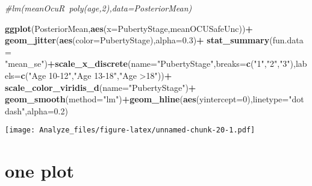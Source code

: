 \documentclass[]{article}
\newenvironment{Shaded}{\begin{snugshade}}{\end{snugshade}}
\newcommand{\KeywordTok}[1]{\textcolor[rgb]{0.13,0.29,0.53}{\textbf{#1}}}
\newcommand{\DataTypeTok}[1]{\textcolor[rgb]{0.13,0.29,0.53}{#1}}
\newcommand{\DecValTok}[1]{\textcolor[rgb]{0.00,0.00,0.81}{#1}}
\newcommand{\FloatTok}[1]{\textcolor[rgb]{0.00,0.00,0.81}{#1}}
\newcommand{\StringTok}[1]{\textcolor[rgb]{0.31,0.60,0.02}{#1}}
\newcommand{\CommentTok}[1]{\textcolor[rgb]{0.56,0.35,0.01}{\textit{#1}}}
\newcommand{\OperatorTok}[1]{\textcolor[rgb]{0.81,0.36,0.00}{\textbf{#1}}}
\newcommand{\NormalTok}[1]{#1}
\begin{document}
\begin{Shaded}
\begin{Highlighting}[]
\CommentTok{#lm(meanOcuR~poly(age,2),data=PosteriorMean)}

\KeywordTok{ggplot}\NormalTok{(PosteriorMean,}\KeywordTok{aes}\NormalTok{(}\DataTypeTok{x=}\NormalTok{PubertyStage,meanOCUSafeUnc))}\OperatorTok{+}
\StringTok{  }\KeywordTok{geom_jitter}\NormalTok{(}\KeywordTok{aes}\NormalTok{(}\DataTypeTok{color=}\NormalTok{PubertyStage),}\DataTypeTok{alpha=}\FloatTok{0.3}\NormalTok{)}\OperatorTok{+}
\StringTok{  }\KeywordTok{stat_summary}\NormalTok{(}\DataTypeTok{fun.data =} \StringTok{"mean_se"}\NormalTok{)}\OperatorTok{+}\KeywordTok{scale_x_discrete}\NormalTok{(}\DataTypeTok{name=}\StringTok{"PubertyStage"}\NormalTok{,}\DataTypeTok{breaks=}\KeywordTok{c}\NormalTok{(}\StringTok{"1"}\NormalTok{,}\StringTok{"2"}\NormalTok{,}\StringTok{"3"}\NormalTok{),}\DataTypeTok{labels=}\KeywordTok{c}\NormalTok{(}\StringTok{"Age 10-12"}\NormalTok{,}\StringTok{"Age 13-18"}\NormalTok{,}\StringTok{"Age >18"}\NormalTok{))}\OperatorTok{+}
\StringTok{  }\KeywordTok{scale_color_viridis_d}\NormalTok{(}\DataTypeTok{name=}\StringTok{"PubertyStage"}\NormalTok{)}\OperatorTok{+}
\StringTok{  }\KeywordTok{geom_smooth}\NormalTok{(}\DataTypeTok{method=}\StringTok{"lm"}\NormalTok{)}\OperatorTok{+}\KeywordTok{geom_hline}\NormalTok{(}\KeywordTok{aes}\NormalTok{(}\DataTypeTok{yintercept=}\DecValTok{0}\NormalTok{),}\DataTypeTok{linetype=}\StringTok{"dotdash"}\NormalTok{,}\DataTypeTok{alpha=}\FloatTok{0.2}\NormalTok{)}
\end{Highlighting}
\end{Shaded}

\texttt{[image: Analyze\_files/figure-latex/unnamed-chunk-20-1.pdf]}

\section{one plot}\label{one-plot}
\end{document}
